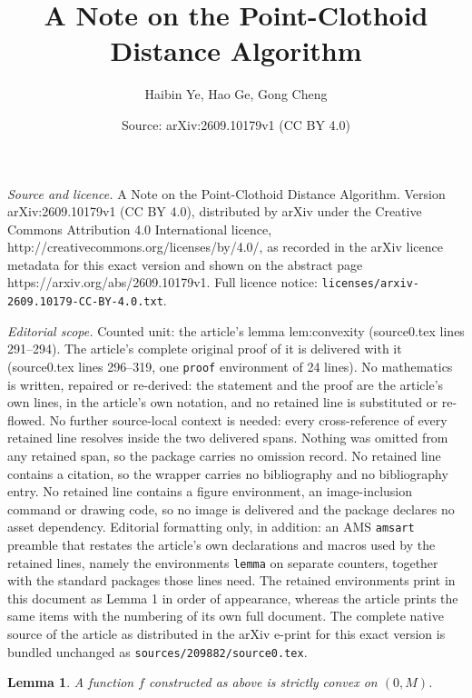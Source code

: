 \documentclass[10pt,a4paper]{amsart}
\title{A Note on the Point-Clothoid Distance Algorithm}
\author{Haibin Ye, Hao Ge, Gong Cheng}
\date{Source: arXiv:2609.10179v1 (CC BY 4.0)}
\newtheorem{lemma}{Lemma}
\begin{document}
\maketitle

\noindent\emph{Source and licence.} A Note on the Point-Clothoid Distance Algorithm. Version arXiv:2609.10179v1 (CC BY 4.0), distributed by arXiv under the Creative Commons Attribution 4.0 International licence, http://creativecommons.org/licenses/by/4.0/, as recorded in the arXiv licence metadata for this exact version and shown on the abstract page https://arxiv.org/abs/2609.10179v1. Full licence notice: \texttt{licenses/arxiv-2609.10179-CC-BY-4.0.txt}.\par\smallskip

\noindent\textit{Editorial scope.} Counted unit: the article's lemma lem:convexity (source0.tex lines 291--294). The article's complete original proof of it is delivered with it (source0.tex lines 296--319, one \texttt{proof} environment of 24 lines). No mathematics is written, repaired or re-derived: the statement and the proof are the article's own lines, in the article's own notation, and no retained line is substituted or re-flowed.  No further source-local context is needed: every cross-reference of every retained line resolves inside the two delivered spans.  Nothing was omitted from any retained span, so the package carries no omission record.  No retained line contains a citation, so the wrapper carries no bibliography and no bibliography entry.  No retained line contains a figure environment, an image-inclusion command or drawing code, so no image is delivered and the package declares no asset dependency.  Editorial formatting only, in addition: an AMS \texttt{amsart} preamble that restates the article's own declarations and macros used by the retained lines, namely the environments \texttt{lemma} on separate counters, together with the standard packages those lines need.  The retained environments print in this document as Lemma 1 in order of appearance, whereas the article prints the same items with the numbering of its own full document.  The complete native source of the article as distributed in the arXiv e-print for this exact version is bundled unchanged as \texttt{sources/209882/source0.tex}.
\begin{lemma}
  \label{lem:convexity}
  A function $f$ constructed as above is strictly convex on $(0,M)$.
\end{lemma}
\end{document}
